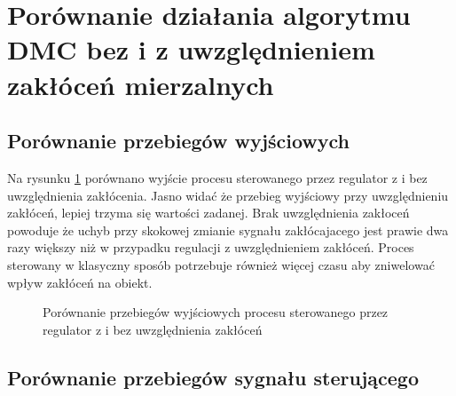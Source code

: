 \FloatBarrier

\section{Porównanie działania algorytmu DMC bez i z uwzględnieniem zakłóceń mierzalnych}
\label{lab5_porownanie}

\subsection{Porównanie przebiegów wyjściowych}
Na rysunku \ref{lab5_porownanie_y} porównano wyjście procesu sterowanego przez regulator z i bez 
uwzględnienia zakłócenia. Jasno widać że przebieg wyjściowy przy uwzględnieniu zakłóceń, lepiej 
trzyma się wartości zadanej. Brak uwzględnienia zakłoceń powoduje że uchyb przy skokowej 
zmianie sygnału zakłócajacego jest prawie dwa razy większy niż w przypadku regulacji z uwzględnieniem zakłóceń.
Proces sterowany w klasyczny sposób potrzebuje również więcej czasu aby zniwelować wpływ zakłóceń na obiekt.

\begin{figure}[b]    
    \centering
    \caption{Porównanie przebiegów wyjściowych procesu sterowanego przez regulator z i bez uwzględnienia zakłóceń}
    \label{lab5_porownanie_y}
\end{figure}
\FloatBarrier

\subsection{Porównanie przebiegów sygnału sterującego}

